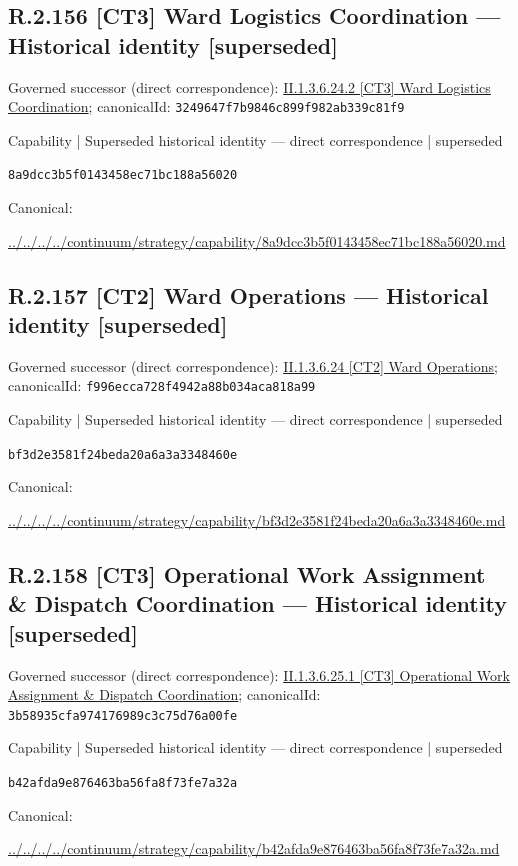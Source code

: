 \documentclass[10pt,a4paper]{article}
\begin{document}
\subsection*{R.2.156 [CT3] Ward Logistics Coordination — Historical identity [superseded]}
Governed successor (direct correspondence): \hyperref[element-3249647f7b9846c899f982ab339c81f9]{II.1.3.6.24.2 [CT3] Ward Logistics Coordination}; canonicalId: \texttt{3249647f7b9846c899f982ab339c81f9}\par
\label{element-8a9dcc3b5f0143458ec71bc188a56020}
{\small Capability | Superseded historical identity — direct correspondence | superseded}\par
\texttt{8a9dcc3b5f0143458ec71bc188a56020}\par
Canonical: \par
{\footnotesize\url{../../../../continuum/strategy/capability/8a9dcc3b5f0143458ec71bc188a56020.md}}\par
\subsection*{R.2.157 [CT2] Ward Operations — Historical identity [superseded]}
Governed successor (direct correspondence): \hyperref[element-f996ecca728f4942a88b034aca818a99]{II.1.3.6.24 [CT2] Ward Operations}; canonicalId: \texttt{f996ecca728f4942a88b034aca818a99}\par
\label{element-bf3d2e3581f24beda20a6a3a3348460e}
{\small Capability | Superseded historical identity — direct correspondence | superseded}\par
\texttt{bf3d2e3581f24beda20a6a3a3348460e}\par
Canonical: \par
{\footnotesize\url{../../../../continuum/strategy/capability/bf3d2e3581f24beda20a6a3a3348460e.md}}\par
\subsection*{R.2.158 [CT3] Operational Work Assignment \& Dispatch Coordination — Historical identity [superseded]}
Governed successor (direct correspondence): \hyperref[element-3b58935cfa974176989c3c75d76a00fe]{II.1.3.6.25.1 [CT3] Operational Work Assignment \& Dispatch Coordination}; canonicalId: \texttt{3b58935cfa974176989c3c75d76a00fe}\par
\label{element-b42afda9e876463ba56fa8f73fe7a32a}
{\small Capability | Superseded historical identity — direct correspondence | superseded}\par
\texttt{b42afda9e876463ba56fa8f73fe7a32a}\par
Canonical: \par
{\footnotesize\url{../../../../continuum/strategy/capability/b42afda9e876463ba56fa8f73fe7a32a.md}}\par
\end{document}
